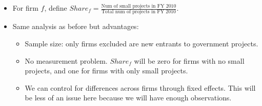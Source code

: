 \documentclass[]{article}
\providecommand{\tightlist}{%
  \setlength{\itemsep}{0pt}\setlength{\parskip}{0pt}}
\begin{document}
\begin{itemize}
\tightlist
\item
  For firm \(f\), define
  \(Share_f = \frac{\text{Num of small projects in FY 2010}}{\text{Total num of projects in FY 2010}}\).
\item
  Same analysis as before but advantages:

  \begin{itemize}
  \tightlist
  \item
    Sample size: only firms excluded are new entrants to government
    projects.
  \item
    No measurement problem. \(Share_f\) will be zero for firms with no
    small projects, and one for firms with only small projects.
  \item
    We can control for differences across firms through fixed effects.
    This will be less of an issue here because we will have enough
    observations.
  \end{itemize}
\end{itemize}
\end{document}
